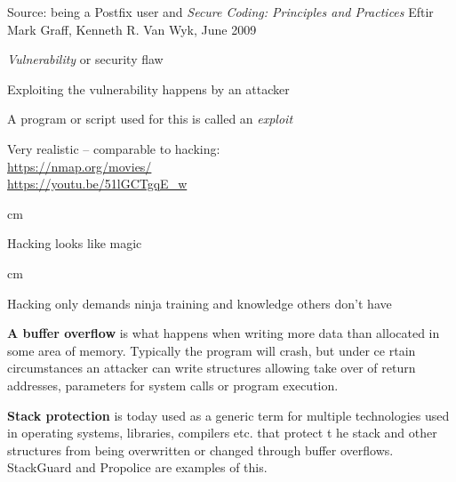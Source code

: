 \documentclass[Screen16to9,17pt]{foils}
\begin{document}
Source: being a Postfix user and \emph{Secure Coding: Principles and Practices}
Eftir Mark Graff, Kenneth R. Van Wyk, June 2009






\begin{list1}
\item \emph{Vulnerability} or security flaw
\item Exploiting the vulnerability happens by an attacker
\item A program or script used for this is called an \emph{exploit}
\end{list1}












Very realistic -- comparable to hacking:\\
\url{https://nmap.org/movies/}\\
\url{https://youtu.be/51lGCTgqE_w}





 cm

\centerline{Hacking looks like magic}




 cm
\centerline{Hacking only demands ninja training and knowledge others don't have}






\begin{list1}
\item {\bfseries A buffer overflow} is what happens when writing more data than allocated in some area of memory. Typically the program will crash, but under ce
rtain circumstances an attacker can write structures allowing take over of return addresses, parameters for system calls or program execution.
\item {\bfseries Stack protection} is today used as a generic term for multiple technologies used in operating systems, libraries, compilers etc. that protect t
he stack and other structures from being overwritten or changed through buffer overflows. StackGuard
and Propolice are examples of this.
\end{list1}
\end{document}

